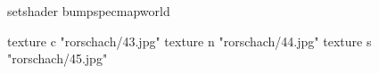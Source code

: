 setshader bumpspecmapworld

    texture c "rorschach/43.jpg"
    texture n "rorschach/44.jpg"
    texture s "rorschach/45.jpg"

